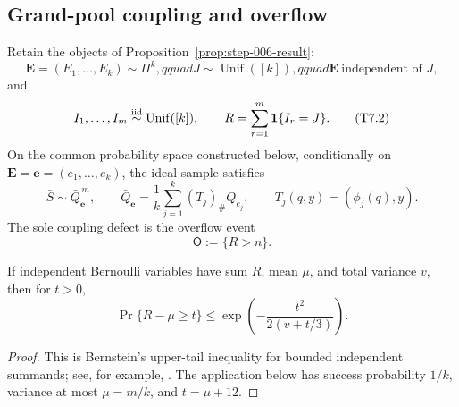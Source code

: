 \subsection{Grand-pool coupling and overflow}
\label{app:step-007}

Retain the objects of Proposition~\ref{prop:step-006-result}:
\[
\mathbf E=(E_1,\ldots,E_k)\sim\Pi^k,qquad
J\sim\operatorname{Unif}([k]),qquad
\mathbf E\ \text{independent of }J,
\tag{T7.1}\label{eq:step-007-t7-1}
\]
and
\[
I_1,\ldots,I_m\stackrel{\rm iid}{\sim}\operatorname{Unif}([k]),
\qquad R=\sum_{r=1}^m\mathbf1\{I_r=J\}.
\tag{T7.2}\label{eq:step-007-t7-2}
\]
On the common probability space constructed below, conditionally on
$\mathbf E=\mathbf e=(e_1,\ldots,e_k)$, the ideal sample satisfies
\[
\bar S\sim\bar Q_{\mathbf e}^{\,m},
\qquad
\bar Q_{\mathbf e}=\frac1k\sum_{j=1}^k(T_j)_\#Q_{e_j},
\qquad T_j(q,y)=(\phi_j(q),y).
\tag{T7.3}\label{eq:step-007-t7-3}
\]
The sole coupling defect is the overflow event
\[
\mathsf O:=\{R>n\}.
\tag{T7.4}\label{eq:step-007-t7-4}
\]

\begin{lemma}
\label{lem:bernstein-occupancy}
If independent Bernoulli variables have sum $R$, mean $\mu$, and total
variance $v$, then for $t>0$,
\[
\Pr\{R-\mu\geq t\}
\leq\exp\left(-\frac{t^2}{2(v+t/3)}\right).
\tag{C7.1}\label{eq:step-007-c7-1}
\]
\end{lemma}
\begin{proof}
This is Bernstein's upper-tail inequality for bounded independent
summands; see, for example, \citet{boucheronLugosiMassart2013}.  The
application below has success probability $1/k$, variance at most
$\mu=m/k$, and $t=\mu+12$.
\end{proof}



